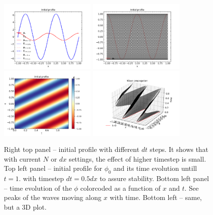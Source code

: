 \documentclass{article}
\begin{document}
\begin{figure}[t]
	\label{fig:grids}
	\centering 
	\includegraphics[width=0.42\textwidth]{./fig3/inital_profile.png}
	\includegraphics[width=0.42\textwidth]{./fig3/wave_propagation_1d.png}
	\includegraphics[width=0.42\textwidth]{./fig3/wave_propagation_colomesh.png}
	\includegraphics[width=0.42\textwidth]{./fig3/wave_propagation_3d.png}
	\caption{Right top panel -- initial profile with different $dt$ steps. It shows that with current $N$ or $dx$ settings, the effect of higher timestep is small. Top left panel -- initial profile for $\phi_0$ and its time evolution untill $t=1.$ with timestep $dt=0.5dx$ to assure stability. Bottom left panel -- time evolution of the $\phi$ colorcoded as a function of $x$ and $t$. See peaks of the waves moving along $x$ with time. Bottom left -- same, but a 3D plot.}
\end{figure}
\end{document}
